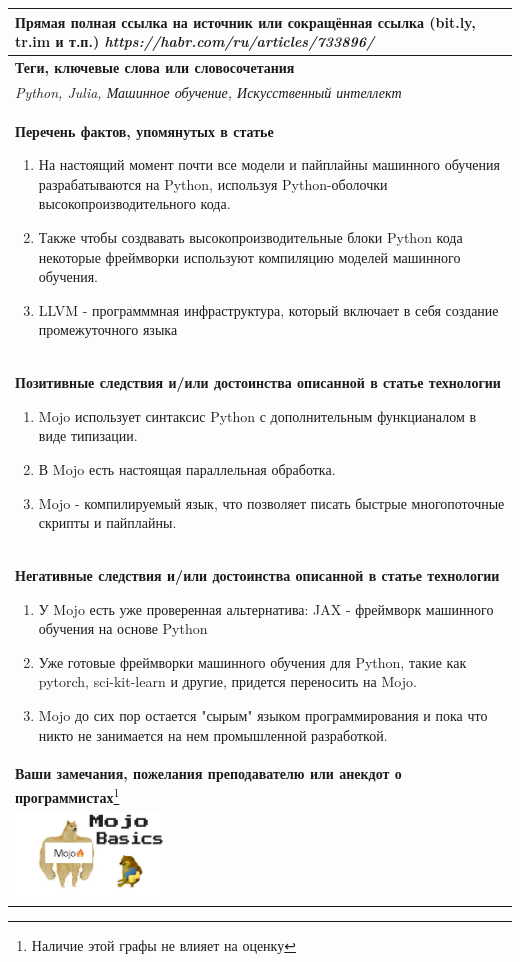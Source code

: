 \documentclass[12pt]{article}
\begin{document}
\begin{tabularx}{\textwidth} { 
  | >{\raggedright\arraybackslash}X|}
    \textbf{Прямая полная ссылка на источник или сокращённая ссылка (bit.ly, tr.im и т.п.)} 
    \textit{https://habr.com/ru/articles/733896/}
    \smallskip\\
    \hline
    \textbf{Теги, ключевые слова или словосочетания}\\
    \textit{Python, Julia, Машинное обучение, Искусственный интеллект}
    \smallskip\\
    \hline
    \textbf{Перечень фактов, упомянутых в статье}
    \begin{enumerate}
	\item На настоящий момент почти все модели и пайплайны машинного обучения разрабатываются на Python, используя Python-оболочки высокопроизводительного кода.
    	\item Также чтобы создвавать высокопроизводительные блоки Python кода некоторые фреймворки используют компиляцию моделей машинного обучения.
    	\item LLVM - программмная инфраструктура, который включает в себя создание промежуточного языка
	\end{enumerate}
    \\ \hline
    \textbf{Позитивные следствия и/или достоинства описанной в статье технологии}
    \begin{enumerate}
    	\item  Mojo использует синтаксис Python с дополнительным функцианалом в виде типизации.
    	\item В Mojo есть настоящая параллельная обработка.
	\item Mojo - компилируемый язык, что позволяет писать быстрые многопоточные скрипты и пайплайны.
    \end{enumerate}
    \\ \hline
    \textbf{Негативные следствия и/или достоинства описанной в статье технологии}
    \begin{enumerate}
    	\item У Mojo есть уже проверенная альтернатива: JAX - фреймворк машинного обучения на основе Python
    	\item Уже готовые фреймворки машинного обучения для Python, такие как pytorch, sci-kit-learn и другие, придется переносить на Mojo.
	\item Mojo до сих пор остается "сырым" языком программирования и пока что никто не занимается на нем промышленной разработкой. 
    \end{enumerate}
    \\ \hline
    \textbf{Ваши замечания, пожелания преподавателю или анекдот о программистах}\footnote{Наличие этой графы не влияет на оценку}\\
    \includegraphics[width=4cm]{meme.jpg}
    \hline
    
\end{tabularx}
\end{document}
